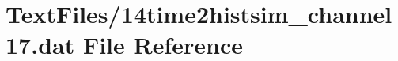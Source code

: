 \hypertarget{14time2histsim__channel17_8dat}{}\section{Text\+Files/14time2histsim\+\_\+channel17.dat File Reference}
\label{14time2histsim__channel17_8dat}

